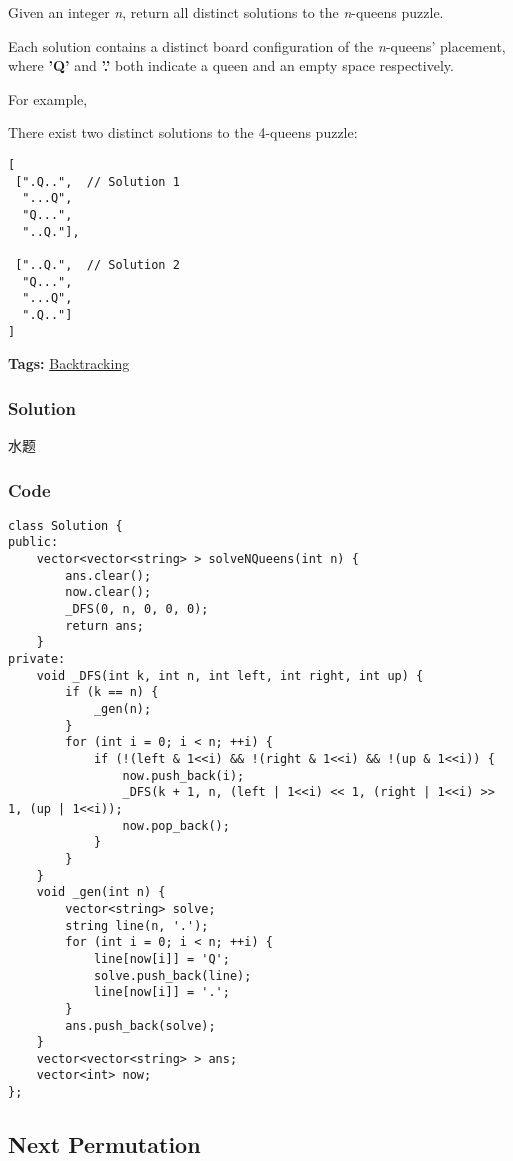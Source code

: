 \documentclass{article}
\begin{document}
\begin{CJK*}{UTF8}{gkai}
Given an integer \emph{n}, return all distinct solutions to the \emph{n}-queens puzzle.

Each solution contains a distinct board configuration of the \emph{n}-queens' placement, where \textbf{'Q'} and \textbf{'.'} both indicate a queen and an empty space respectively.

For example,


There exist two distinct solutions to the 4-queens puzzle:

\begin{verbatim}
[
 [".Q..",  // Solution 1
  "...Q",
  "Q...",
  "..Q."],

 ["..Q.",  // Solution 2
  "Q...",
  "...Q",
  ".Q.."]
]
\end{verbatim}

\textbf{Tags: }
\hyperref[ Backtracking ]{ Backtracking }



\subsubsection*{Solution}
水题

\subsubsection*{Code}
\begin{lstlisting}
class Solution {
public:
    vector<vector<string> > solveNQueens(int n) {
        ans.clear();
        now.clear();
        _DFS(0, n, 0, 0, 0);
        return ans;
    }
private:
    void _DFS(int k, int n, int left, int right, int up) {
        if (k == n) {
            _gen(n);
        }
        for (int i = 0; i < n; ++i) {
            if (!(left & 1<<i) && !(right & 1<<i) && !(up & 1<<i)) {
                now.push_back(i);
                _DFS(k + 1, n, (left | 1<<i) << 1, (right | 1<<i) >> 1, (up | 1<<i));
                now.pop_back();
            }
        }
    }
    void _gen(int n) {
        vector<string> solve;
        string line(n, '.');
        for (int i = 0; i < n; ++i) {
            line[now[i]] = 'Q';
            solve.push_back(line);
            line[now[i]] = '.';
        }
        ans.push_back(solve);
    }
    vector<vector<string> > ans;
    vector<int> now;
}; 
\end{lstlisting}


\subsection{ Next Permutation }
\label{ Next Permutation }


\end{CJK*}
\end{document}
